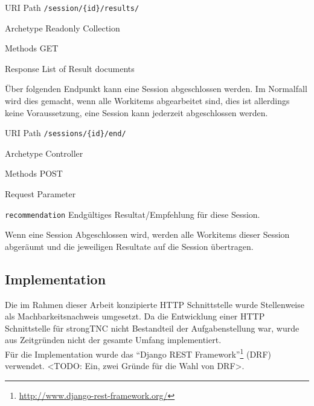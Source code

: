 \begin{mdframed}[style=def]
\begin{description*}
	\item[URI Path] \texttt{/session/\{id\}/results/}
	\item[Archetype] Readonly Collection
	\item[Methods] GET
	\item[Response] List of Result documents
\end{description*}
\end{mdframed}

Über folgenden Endpunkt kann eine Session abgeschlossen werden. Im Normalfall
wird dies gemacht, wenn alle Workitems abgearbeitet sind, dies ist allerdings
keine Voraussetzung, eine Session kann jederzeit abgeschlossen werden.

\begin{mdframed}[style=def]
\begin{description*}
	\item[URI Path] \texttt{/sessions/\{id\}/end/}
	\item[Archetype] Controller
	\item[Methods] POST
	\item[Request Parameter] \hfill
	\begin{description*}
		\item[\texttt{recommendation}] Endgültiges Resultat/Empfehlung für diese
		Session.
	\end{description*}
\end{description*}
\end{mdframed}

Wenn eine Session Abgeschlossen wird, werden alle Workitems dieser Session
abgeräumt und die jeweiligen Resultate auf die Session übertragen.

\subsection{Implementation}
Die im Rahmen dieser Arbeit konzipierte HTTP Schnittstelle wurde Stellenweise
als Machbarkeitsnachweis umgesetzt. Da die Entwicklung einer HTTP Schnittstelle
für strongTNC nicht Bestandteil der Aufgabenstellung war, wurde aus Zeitgründen
nicht der gesamte Umfang implementiert.\\
Für die Implementation wurde das \enquote{Django REST
Framework}\footnote{\url{http://www.django-rest-framework.org/}} (DRF)
verwendet. <TODO: Ein, zwei Gründe für die Wahl von DRF>.













